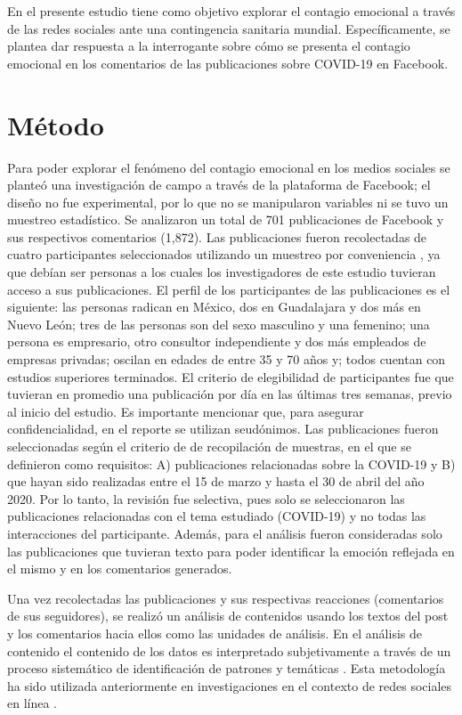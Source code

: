 \documentclass{textolivre}
\begin{document}
En el presente estudio tiene como objetivo explorar el contagio emocional a través de las redes sociales ante una contingencia sanitaria mundial. Específicamente, se plantea dar respuesta a la interrogante sobre cómo se presenta el contagio emocional en los comentarios de las publicaciones sobre COVID-19 en Facebook. 


\section{Método}
Para poder explorar el fenómeno del contagio emocional en los medios sociales se planteó una investigación de campo a través de la plataforma de Facebook; el diseño no fue experimental, por lo que no se manipularon variables ni se tuvo un muestreo estadístico.  Se analizaron un total de 701 publicaciones de Facebook y sus respectivos comentarios (1,872). Las publicaciones fueron recolectadas de cuatro participantes seleccionados utilizando un muestreo por conveniencia \cite{creswell2018}, ya que debían ser personas a los cuales los investigadores de este estudio tuvieran acceso a sus publicaciones. El perfil de los participantes de las publicaciones es el siguiente: las personas radican en México, dos en Guadalajara y dos más en Nuevo León; tres de las personas son del sexo masculino y una femenino; una persona es empresario, otro consultor independiente y dos más empleados de empresas privadas; oscilan en edades de entre 35 y 70 años y; todos cuentan con estudios superiores terminados. El criterio de elegibilidad de participantes fue que tuvieran en promedio una publicación por día en las últimas tres semanas, previo al inicio del estudio. Es importante mencionar que, para asegurar confidencialidad, en el reporte se utilizan seudónimos. Las publicaciones fueron seleccionadas según el criterio de \textcite{creswell2018} de recopilación de muestras, en el que se definieron como requisitos: A) publicaciones relacionadas sobre la COVID-19 y B) que hayan sido realizadas entre el 15 de marzo y hasta el 30 de abril del año 2020. Por lo tanto, la revisión fue selectiva, pues solo se seleccionaron las publicaciones relacionadas con el tema estudiado (COVID-19) y no todas las interacciones del participante. Además, para el análisis fueron consideradas solo las publicaciones que tuvieran texto para poder identificar la emoción reflejada en el mismo y en los comentarios generados.

Una vez recolectadas las publicaciones y sus respectivas reacciones (comentarios de sus seguidores), se realizó un análisis de contenidos usando los textos del post y los comentarios hacia ellos como las unidades de análisis. En el análisis de contenido el contenido de los datos es interpretado subjetivamente a través de un proceso sistemático de identificación de patrones y temáticas \cite{hsieh2005}. Esta metodología ha sido utilizada anteriormente en investigaciones en el contexto de redes sociales en línea \cite{woolley2010,hum2011,parsons2013,valerioUrea2015}.
\end{document}
